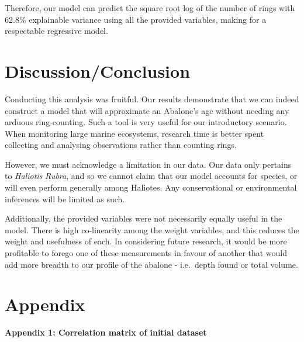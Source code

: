 \documentclass[letterpaper,9pt,twocolumn,twoside,]{pinp}
\begin{document}
Therefore, our model can predict the square root log of the number of
rings with 62.8\% explainable variance using all the provided variables,
making for a respectable regressive model.

\hypertarget{discussionconclusion}{%
\section{Discussion/Conclusion}\label{discussionconclusion}}

Conducting this analysis was fruitful. Our results demonstrate that we
can indeed construct a model that will approximate an Abalone's age
without needing any arduous ring-counting. Such a tool is very useful
for our introductory scenario. When monitoring large marine ecosystems,
research time is better spent collecting and analysing observations
rather than counting rings.

\par

However, we must acknowledge a limitation in our data. Our data only
pertains to \emph{Haliotis} \emph{Rubra}, and so we cannot claim that
our model accounts for species, or will even perform generally among
Haliotes. Any conservational or environmental inferences will be limited
as such.

\par

Additionally, the provided variables were not necessarily equally useful
in the model. There is high co-linearity among the weight variables, and
this reduces the weight and usefulness of each. In considering future
research, it would be more profitable to forego one of these
measurements in favour of another that would add more breadth to our
profile of the abalone - i.e.~depth found or total volume. \pagebreak

\hypertarget{appendix}{%
\section{Appendix}\label{appendix}}

\textbf{Appendix 1: Correlation matrix of initial dataset}
\end{document}
